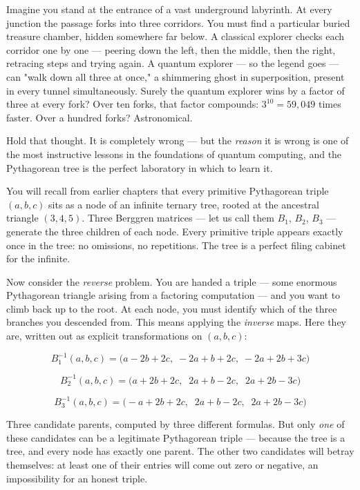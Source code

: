 \documentclass[12pt, letterpaper, openany]{book}
\theoremstyle{definition}
\theoremstyle{remark}
\begin{document}
Imagine you stand at the entrance of a vast underground labyrinth. At every junction the passage forks into three corridors. You must find a particular buried treasure chamber, hidden somewhere far below. A classical explorer checks each corridor one by one --- peering down the left, then the middle, then the right, retracing steps and trying again. A quantum explorer --- so the legend goes --- can "walk down all three at once," a shimmering ghost in superposition, present in every tunnel simultaneously. Surely the quantum explorer wins by a factor of three at every fork? Over ten forks, that factor compounds: $3^{10} = 59{,}049$ times faster. Over a hundred forks? Astronomical.

Hold that thought. It is completely wrong --- but the \textit{reason} it is wrong is one of the most instructive lessons in the foundations of quantum computing, and the Pythagorean tree is the perfect laboratory in which to learn it.

You will recall from earlier chapters that every primitive Pythagorean triple $(a, b, c)$ sits as a node of an infinite ternary tree, rooted at the ancestral triangle $(3, 4, 5)$. Three Berggren matrices --- let us call them $B_1$, $B_2$, $B_3$ --- generate the three children of each node. Every primitive triple appears exactly once in the tree: no omissions, no repetitions. The tree is a perfect filing cabinet for the infinite.

Now consider the \textit{reverse} problem. You are handed a triple --- some enormous Pythagorean triangle arising from a factoring computation --- and you want to climb back up to the root. At each node, you must identify which of the three branches you descended from. This means applying the \textit{inverse} maps. Here they are, written out as explicit transformations on $(a, b, c)$:

\[
B_1^{-1}(a,b,c) = \bigl(a - 2b + 2c,\;-2a + b + 2c,\;-2a + 2b + 3c\bigr)
\]

\[
B_2^{-1}(a,b,c) = \bigl(a + 2b + 2c,\;\;2a + b - 2c,\;\;2a + 2b - 3c\bigr)
\]

\[
B_3^{-1}(a,b,c) = \bigl(-a + 2b + 2c,\;\;2a + b - 2c,\;\;2a + 2b - 3c\bigr)
\]

Three candidate parents, computed by three different formulas. But only \textit{one} of these candidates can be a legitimate Pythagorean triple --- because the tree is a tree, and every node has exactly one parent. The other two candidates will betray themselves: at least one of their entries will come out zero or negative, an impossibility for an honest triple.
\end{document}
